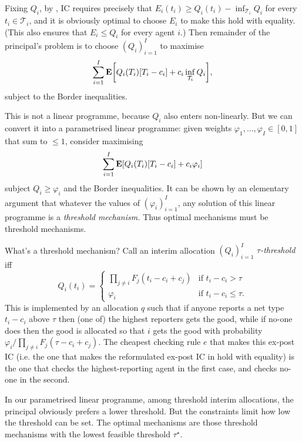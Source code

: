 Fixing $Q_i$, by ,
IC requires precisely that $E_i(t_i) \geq Q_i(t_i) - \inf_{\mathcal{T}_i} Q_i$ for every $t_i \in \mathcal{T}_i$,
and it is obviously optimal to choose $E_i$ to make this hold with equality.
(This also ensures that $E_i \leq Q_i$ for every agent $i$.)
Then remainder of the principal's problem is to choose $(Q_i)_{i=1}^I$ to maximise
%
\begin{equation*}
	\sum_{i=1}^I \E \left[ Q_i(T_i) [T_i-c_i]
	+ c_i \inf_{\mathcal{T}_i} Q_i \right] ,
\end{equation*}
%
subject to the Border inequalities.

This is not a linear programme, because $Q_i$ also enters non-linearly.
But we can convert it into a parametrised linear programme:
given weights $\varphi_1,\dots,\varphi_I \in [0,1]$ that sum to $\leq 1$, consider maximising
%
\begin{equation*}
	\sum_{i=1}^I \E \left[ Q_i(T_i) [T_i-c_i]
	+ c_i \varphi_i \right] 
\end{equation*}
%
subject $Q_i \geq \varphi_i$ and the Border inequalities.
It can be shown by an elementary argument \parencite[see][]{ErlansonKleiner2019} that whatever the values of $(\varphi_i)_{i=1}^I$, any solution of this linear programme is a \emph{threshold mechanism.}
Thus optimal mechanisms must be threshold mechanisms.

What's a threshold mechanism?
Call an interim allocation $(Q_i)_{i=1}^I$
\emph{$\tau$-threshold} iff
%
\begin{equation*}
	Q_i(t_i) =
	\begin{cases}
		\prod_{j \neq i} F_j(t_i-c_i+c_j)
		& \text{if $t_i-c_i > \tau$} \\
		\varphi_i
		& \text{if $t_i-c_i \leq \tau$.} 
	\end{cases}
\end{equation*}
%
This is implemented by an allocation $q$
such that if anyone reports a net type $t_i-c_i$ above $\tau$ then (one of) the highest reporters gets the good,
while if no-one does then the good is allocated so that $i$ gets the good with probability $\varphi_i / \prod_{j \neq i} F_j(\tau-c_i+c_j)$.
The cheapest checking rule $e$ that makes this ex-post IC (i.e. the one that makes the reformulated ex-post IC in  hold with equality) is the one that checks the highest-reporting agent in the first case, and checks no-one in the second.

In our parametrised linear programme, among threshold interim allocations, the principal obviously prefers a lower threshold.
But the constraints limit how low the threshold can be set.
The optimal mechanisms are those threshold mechanisms with the lowest feasible threshold $\tau^\star$.

